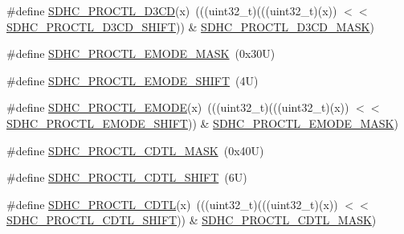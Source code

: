 \begin{DoxyCompactItemize}
\item 
\#define \mbox{\hyperlink{group___s_d_h_c___register___masks_gaea6d40bce5706621ef3f8b510b9f7f58}{S\+D\+H\+C\+\_\+\+P\+R\+O\+C\+T\+L\+\_\+\+D3\+CD}}(x)~(((uint32\+\_\+t)(((uint32\+\_\+t)(x)) $<$$<$ \mbox{\hyperlink{group___s_d_h_c___register___masks_ga9bd9fc5a38a643e4a04f03026a18e55a}{S\+D\+H\+C\+\_\+\+P\+R\+O\+C\+T\+L\+\_\+\+D3\+C\+D\+\_\+\+S\+H\+I\+FT}})) \& \mbox{\hyperlink{group___s_d_h_c___register___masks_ga597b9ab57f2ad515508d8b2e8b3832c7}{S\+D\+H\+C\+\_\+\+P\+R\+O\+C\+T\+L\+\_\+\+D3\+C\+D\+\_\+\+M\+A\+SK}})
\item 
\#define \mbox{\hyperlink{group___s_d_h_c___register___masks_ga18ccde546ac8eb940360a8ff3671723b}{S\+D\+H\+C\+\_\+\+P\+R\+O\+C\+T\+L\+\_\+\+E\+M\+O\+D\+E\+\_\+\+M\+A\+SK}}~(0x30\+U)
\item 
\#define \mbox{\hyperlink{group___s_d_h_c___register___masks_gaf41ed2806a975210d570ee34cfe81630}{S\+D\+H\+C\+\_\+\+P\+R\+O\+C\+T\+L\+\_\+\+E\+M\+O\+D\+E\+\_\+\+S\+H\+I\+FT}}~(4\+U)
\item 
\#define \mbox{\hyperlink{group___s_d_h_c___register___masks_ga1c3a2c1c26d5ef0ddb1b54d3ef90fd46}{S\+D\+H\+C\+\_\+\+P\+R\+O\+C\+T\+L\+\_\+\+E\+M\+O\+DE}}(x)~(((uint32\+\_\+t)(((uint32\+\_\+t)(x)) $<$$<$ \mbox{\hyperlink{group___s_d_h_c___register___masks_gaf41ed2806a975210d570ee34cfe81630}{S\+D\+H\+C\+\_\+\+P\+R\+O\+C\+T\+L\+\_\+\+E\+M\+O\+D\+E\+\_\+\+S\+H\+I\+FT}})) \& \mbox{\hyperlink{group___s_d_h_c___register___masks_ga18ccde546ac8eb940360a8ff3671723b}{S\+D\+H\+C\+\_\+\+P\+R\+O\+C\+T\+L\+\_\+\+E\+M\+O\+D\+E\+\_\+\+M\+A\+SK}})
\item 
\#define \mbox{\hyperlink{group___s_d_h_c___register___masks_ga8af505ec10166a4196541f055cad8907}{S\+D\+H\+C\+\_\+\+P\+R\+O\+C\+T\+L\+\_\+\+C\+D\+T\+L\+\_\+\+M\+A\+SK}}~(0x40\+U)
\item 
\#define \mbox{\hyperlink{group___s_d_h_c___register___masks_ga84652338a2704314d7ab2381a351215c}{S\+D\+H\+C\+\_\+\+P\+R\+O\+C\+T\+L\+\_\+\+C\+D\+T\+L\+\_\+\+S\+H\+I\+FT}}~(6\+U)
\item 
\#define \mbox{\hyperlink{group___s_d_h_c___register___masks_gae11db02d349c5e95ac4512ce751be820}{S\+D\+H\+C\+\_\+\+P\+R\+O\+C\+T\+L\+\_\+\+C\+D\+TL}}(x)~(((uint32\+\_\+t)(((uint32\+\_\+t)(x)) $<$$<$ \mbox{\hyperlink{group___s_d_h_c___register___masks_ga84652338a2704314d7ab2381a351215c}{S\+D\+H\+C\+\_\+\+P\+R\+O\+C\+T\+L\+\_\+\+C\+D\+T\+L\+\_\+\+S\+H\+I\+FT}})) \& \mbox{\hyperlink{group___s_d_h_c___register___masks_ga8af505ec10166a4196541f055cad8907}{S\+D\+H\+C\+\_\+\+P\+R\+O\+C\+T\+L\+\_\+\+C\+D\+T\+L\+\_\+\+M\+A\+SK}})
$$
\end{DoxyCompactItemize}
